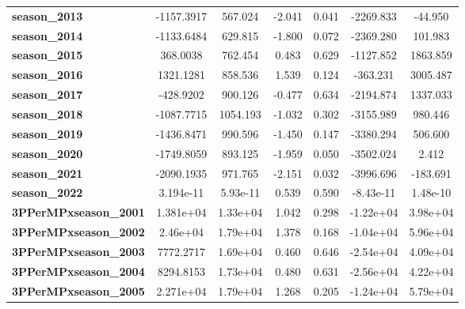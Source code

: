 \begin{center}
\begin{tabular}{lcccccc}
\textbf{season\_2013}         &   -1157.3917  &      567.024     &    -2.041  &         0.041        &    -2269.833    &      -44.950     \\
\textbf{season\_2014}         &   -1133.6484  &      629.815     &    -1.800  &         0.072        &    -2369.280    &      101.983     \\
\textbf{season\_2015}         &     368.0038  &      762.454     &     0.483  &         0.629        &    -1127.852    &     1863.859     \\
\textbf{season\_2016}         &    1321.1281  &      858.536     &     1.539  &         0.124        &     -363.231    &     3005.487     \\
\textbf{season\_2017}         &    -428.9202  &      900.126     &    -0.477  &         0.634        &    -2194.874    &     1337.033     \\
\textbf{season\_2018}         &   -1087.7715  &     1054.193     &    -1.032  &         0.302        &    -3155.989    &      980.446     \\
\textbf{season\_2019}         &   -1436.8471  &      990.596     &    -1.450  &         0.147        &    -3380.294    &      506.600     \\
\textbf{season\_2020}         &   -1749.8059  &      893.125     &    -1.959  &         0.050        &    -3502.024    &        2.412     \\
\textbf{season\_2021}         &   -2090.1935  &      971.765     &    -2.151  &         0.032        &    -3996.696    &     -183.691     \\
\textbf{season\_2022}         &    3.194e-11  &     5.93e-11     &     0.539  &         0.590        &    -8.43e-11    &     1.48e-10     \\
\textbf{3PPerMPxseason\_2001} &    1.381e+04  &     1.33e+04     &     1.042  &         0.298        &    -1.22e+04    &     3.98e+04     \\
\textbf{3PPerMPxseason\_2002} &     2.46e+04  &     1.79e+04     &     1.378  &         0.168        &    -1.04e+04    &     5.96e+04     \\
\textbf{3PPerMPxseason\_2003} &    7772.2717  &     1.69e+04     &     0.460  &         0.646        &    -2.54e+04    &     4.09e+04     \\
\textbf{3PPerMPxseason\_2004} &    8294.8153  &     1.73e+04     &     0.480  &         0.631        &    -2.56e+04    &     4.22e+04     \\
\textbf{3PPerMPxseason\_2005} &    2.271e+04  &     1.79e+04     &     1.268  &         0.205        &    -1.24e+04    &     5.79e+04     \\

\end{tabular}
\end{center}
